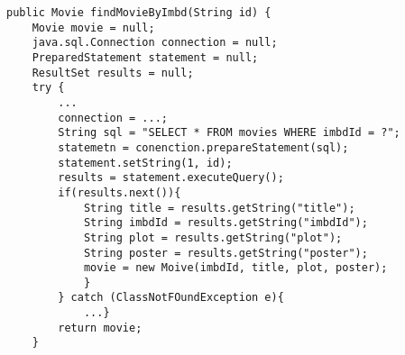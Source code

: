 \documentclass[10pt,landscape]{article}
\begin{document}
\begin{multicols}{3}
\begin{lstlisting}
\end{lstlisting}

\begin{lstlisting}
public Movie findMovieByImbd(String id) {
    Movie movie = null;
    java.sql.Connection connection = null;
    PreparedStatement statement = null;
    ResultSet results = null;
    try {
        ...
        connection = ...;
        String sql = "SELECT * FROM movies WHERE imbdId = ?";
        statemetn = conenction.prepareStatement(sql);
        statement.setString(1, id);
        results = statement.executeQuery();
        if(results.next()){
            String title = results.getString("title");
            String imbdId = results.getString("imbdId");
            String plot = results.getString("plot");
            String poster = results.getString("poster");
            movie = new Moive(imbdId, title, plot, poster);
            }
        } catch (ClassNotFOundException e){
            ...}
        return movie;
    }
\end{lstlisting}




\end{multicols}
\end{document}
